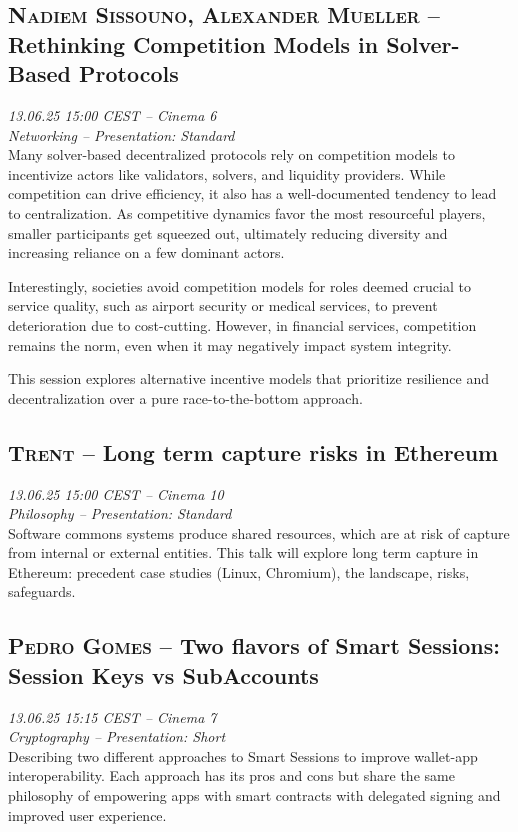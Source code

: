 \clearpage
\subsection {\textsc{Nadiem Sissouno, Alexander Mueller}  -- Rethinking Competition Models in Solver-Based Protocols} \noindent \textit {13.06.25 15:00 CEST -- Cinema 6\\ Networking -- Presentation: Standard}\\[1em] Many solver-based decentralized protocols rely on competition models to incentivize actors like validators, solvers, and liquidity providers. While competition can drive efficiency, it also has a well-documented tendency to lead to centralization. As competitive dynamics favor the most resourceful players, smaller participants get squeezed out, ultimately reducing diversity and increasing reliance on a few dominant actors.

Interestingly, societies avoid competition models for roles deemed crucial to service quality, such as airport security or medical services, to prevent deterioration due to cost-cutting. However, in financial services, competition remains the norm, even when it may negatively impact system integrity.

This session explores alternative incentive models that prioritize resilience and decentralization over a pure race-to-the-bottom approach.

\clearpage
\subsection {\textsc{Trent}  -- Long term capture risks in Ethereum} \noindent \textit {13.06.25 15:00 CEST -- Cinema 10\\ Philosophy -- Presentation: Standard}\\[1em] Software commons systems produce shared resources, which are at risk of capture from internal or external entities. This talk will explore long term capture in Ethereum: precedent case studies (Linux, Chromium), the landscape, risks, safeguards.

\clearpage
\subsection {\textsc{Pedro Gomes}  -- Two flavors of Smart Sessions: Session Keys vs SubAccounts} \noindent \textit {13.06.25 15:15 CEST -- Cinema 7\\ Cryptography -- Presentation: Short}\\[1em] Describing two different approaches to Smart Sessions to improve wallet-app interoperability. Each approach has its pros and cons but share the same philosophy of empowering apps with smart contracts with delegated signing and improved user experience.

